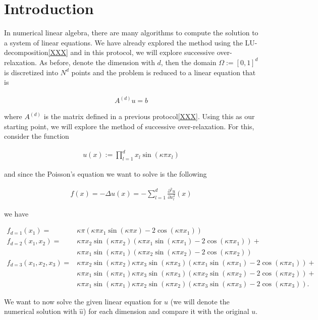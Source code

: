 \section{Introduction}
In numerical linear algebra, there are many algorithms to compute the solution to a system of 
linear equations. We have already explored the method using the LU-decomposition\ref{XXX} and 
in this protocol, we will explore successive over-relaxation. As before, denote the dimension 
with \(d\), then the domain \(\Omega := [0, 1]^d\) is discretized into \(N^d\) points and the 
problem is reduced to a linear equation that is

\begin{align*}
	A^{(d)} u = b
\end{align*}

where \(A^{(d)}\) is the matrix defined in a previous protocol\ref{XXX}. Using this as our 
starting point, we will explore the method of successive over-relaxation. For this, consider the 
function

\begin{align*}
	u(x) := \prod_{l=1}^d x_l \sin (\kappa \pi x_l)
\end{align*}

and since the Poisson's equation we want to solve is the following

\begin{align*}
	f(x) = - \Delta u(x) = -\sum_{l = 1}^d \frac{\partial^2 u}{\partial x_l^2} (x)
\end{align*}

we have

\begin{align*}
	f_{d=1} (x_1) =& \kappa \pi \left( \kappa \pi x_1 \sin ( \kappa \pi x ) - 2 \cos( \kappa \pi x_1) \right) \\
%	
	f_{d=2} (x_1, x_2) =& \kappa \pi x_2 \sin( \kappa \pi x_2) \left(  \kappa \pi x_1 \sin(\kappa \pi x_1) - 2 \cos ( \kappa \pi x_1) \right) + \\ 
	& \kappa \pi x_1 \sin( \kappa \pi x_1) \left(  \kappa \pi x_2 \sin(\kappa \pi x_2) - 2 \cos ( \kappa \pi x_2) \right) \\
%
	f_{d=3} (x_1, x_2, x_3) =& \kappa \pi x_2 \sin( \kappa \pi x_2) \kappa \pi x_3 \sin(\kappa \pi x_3)  \left(  \kappa \pi x_1 \sin(\kappa \pi x_1) - 2 \cos ( \kappa \pi x_1) \right) + \\
	& \kappa \pi x_1 \sin( \kappa \pi x_1) \kappa \pi x_3 \sin(\kappa \pi x_3)  \left(  \kappa \pi x_2 \sin(\kappa \pi x_2) - 2 \cos ( \kappa \pi x_2) \right) + \\
	& \kappa \pi x_1 \sin( \kappa \pi x_1) \kappa \pi x_2 \sin(\kappa \pi x_2)  \left(  \kappa \pi x_3 \sin(\kappa \pi x_3) - 2 \cos ( \kappa \pi x_3) \right) \text{.}
\end{align*}

We want to now solve the given linear equation for \(u\) (we will denote the numerical solution with \(\hat{u}\)) for each dimension and compare it with the original \(u\).
